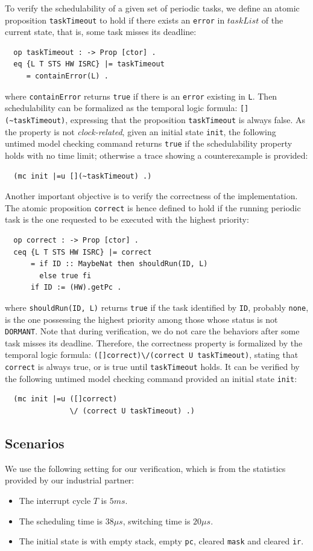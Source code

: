 \documentclass[journal]{IEEEtranTIE}
\begin{document}
To verify the schedulability of a given set of periodic tasks, we
define an atomic proposition \verb|taskTimeout| to hold if there
exists an \verb|error| in $\mathit{taskList}$ of the current state,
that is, some task misses its deadline:
\begin{verbatim}
  op taskTimeout : -> Prop [ctor] .
  eq {L T STS HW ISRC} |= taskTimeout 
     = containError(L) .
\end{verbatim}
where \verb|containError| returns \verb|true| if there is an
\verb|error| existing in \verb|L|. Then schedulability can be
formalized as the temporal logic formula: \verb|[](~taskTimeout)|,
expressing that the proposition \verb|taskTimeout| is always false. As
the property is not \emph{clock-related}, given an initial state
\verb|init|, the following untimed model checking command returns
\verb|true| if the schedulability property holds with no time limit;
otherwise a trace showing a counterexample is provided:
\begin{verbatim}
  (mc init |=u [](~taskTimeout) .)
\end{verbatim}

Another important objective is to verify the correctness of the
implementation.  The atomic proposition \verb|correct| is hence
defined to hold if the running periodic task is the one requested to
be executed with the highest priority:
\begin{verbatim}
  op correct : -> Prop [ctor] .
  ceq {L T STS HW ISRC} |= correct
      = if ID :: MaybeNat then shouldRun(ID, L)
        else true fi
      if ID := (HW).getPc .
\end{verbatim}
where \verb|shouldRun(ID, L)| returns \verb|true| if the task
identified by \verb|ID|, probably \verb|none|, is the one possessing
the highest priority among those whose status is not
\verb|DORMANT|. Note that during verification, we do not care the
behaviors after some task misses its deadline. Therefore, the
correctness property is formalized by the temporal logic formula:
\verb|([]correct)\/(correct U taskTimeout)|, stating that
\verb|correct| is always true, or is true until \verb|taskTimeout|
holds. It can be verified by the following untimed model checking
command provided an initial state \verb|init|:
\begin{verbatim}
  (mc init |=u ([]correct) 
               \/ (correct U taskTimeout) .)
\end{verbatim}

\subsection{Scenarios}
\label{ss:results}
We use the following setting for our verification, which is from the 
statistics provided by our industrial partner:
\begin{itemize}
\item The interrupt cycle $T$ is $5ms$.
\item The scheduling time is $38{\mu}s$, switching time is $20{\mu}s$.
\item The initial state is with empty stack, empty \verb|pc|, cleared 
\verb|mask| and cleared \verb|ir|.
\end{itemize}
\end{document}
